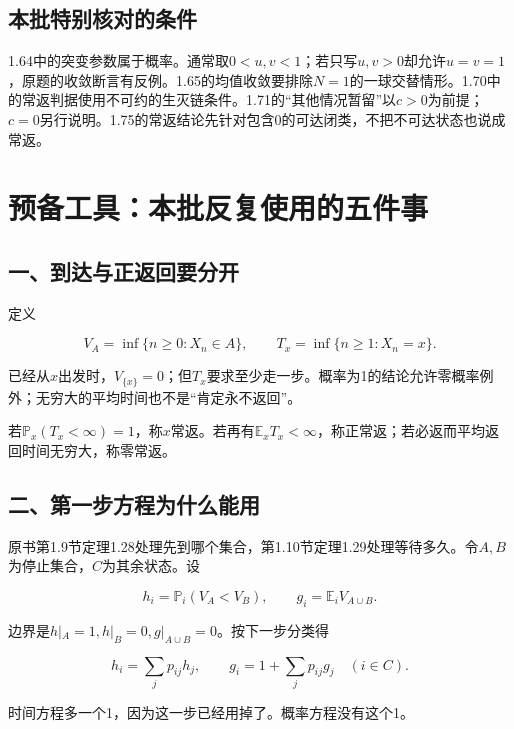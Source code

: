 \documentclass[
  11pt,a4paper,UTF8,fontset=fandol]{ctexart}
\begin{document}
\subsection{本批特别核对的条件}\label{ux672cux6279ux7279ux522bux6838ux5bf9ux7684ux6761ux4ef6}

1.64中的突变参数属于概率。通常取\(0<u,v<1\)；若只写\(u,v>0\)却允许\(u=v=1\)，原题的收敛断言有反例。1.65的均值收敛要排除\(N=1\)的一球交替情形。1.70中的常返判据使用不可约的生灭链条件。1.71的``其他情况暂留''以\(c>0\)为前提；\(c=0\)另行说明。1.75的常返结论先针对包含0的可达闭类，不把不可达状态也说成常返。

\section{预备工具：本批反复使用的五件事}\label{ux9884ux5907ux5de5ux5177ux672cux6279ux53cdux590dux4f7fux7528ux7684ux4e94ux4ef6ux4e8b}

\subsection{一、到达与正返回要分开}\label{ux4e00ux5230ux8fbeux4e0eux6b63ux8fd4ux56deux8981ux5206ux5f00}

定义

\[
V_A=\inf\{n\ge0:X_n\in A\},\qquad T_x=\inf\{n\ge1:X_n=x\}.
\]

已经从\(x\)出发时，\(V_{\{x\}}=0\)；但\(T_x\)要求至少走一步。概率为1的结论允许零概率例外；无穷大的平均时间也不是``肯定永不返回''。

若\(\mathbb P_x(T_x<\infty)=1\)，称\(x\)常返。若再有\(\mathbb E_xT_x<\infty\)，称正常返；若必返而平均返回时间无穷大，称零常返。

\subsection{二、第一步方程为什么能用}\label{ux4e8cux7b2cux4e00ux6b65ux65b9ux7a0bux4e3aux4ec0ux4e48ux80fdux7528}

原书第1.9节定理1.28处理先到哪个集合，第1.10节定理1.29处理等待多久。令\(A,B\)为停止集合，\(C\)为其余状态。设

\[
h_i=\mathbb P_i(V_A<V_B),\qquad g_i=\mathbb E_iV_{A\cup B}.
\]

边界是\(h|_A=1,h|_B=0,g|_{A\cup B}=0\)。按下一步分类得

\[
h_i=\sum_jp_{ij}h_j,\qquad g_i=1+\sum_jp_{ij}g_j\quad(i\in C).
\]

时间方程多一个1，因为这一步已经用掉了。概率方程没有这个1。
\end{document}
